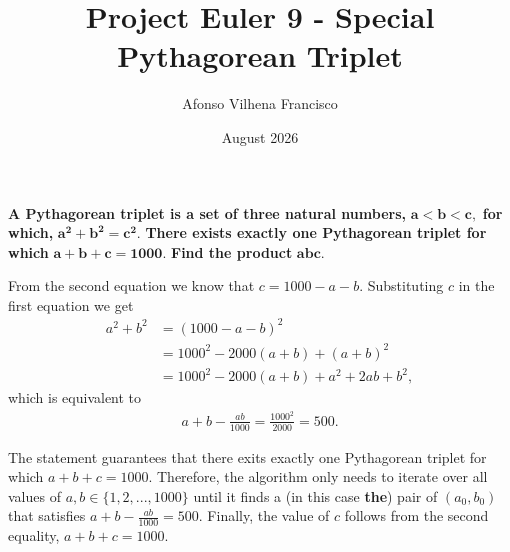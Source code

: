 \documentclass{article}
\title{Project Euler 9 - Special Pythagorean Triplet}
\author{Afonso Vilhena Francisco }
\date{August 2026}
\begin{document}
\maketitle

\textbf{A Pythagorean triplet is a set of three natural numbers,} $\mathbf{a<b<c},$ \textbf{ for which,} $\mathbf{a^2+b^2=c^2}.$ \textbf{There exists exactly one Pythagorean triplet for which} $\mathbf{a+b+c=1000}.$ \textbf{Find the product} $\mathbf{abc}$.

\vspace{0.5cm}

From the second equation we know that $c=1000-a-b$. Substituting $c$ in the first equation we get
\begin{align*}
    a^2+b^2 & = (1000-a-b)^2\\
            & = 1000^2-2000(a+b)+(a+b)^2\\
            & = 1000^2 -2000(a+b)+a^2+2ab+b^2,
\end{align*}
which is equivalent to
\begin{align*}
    a+b-\frac{ab}{1000}=\frac{1000^2}{2000}=500.
\end{align*}

The statement guarantees that there exits exactly one Pythagorean triplet for which $a+b+c=1000$. Therefore, the algorithm only needs to iterate over all values of $a,b \in \{ 1,2,...,1000\}$ until it finds a (in this case \textbf{the}) pair of $(a_0,b_0)$ that satisfies $ a+b-\frac{ab}{1000}=500$. Finally, the value of $c$ follows from the second equality, $a+b+c=1000$.
\end{document}
